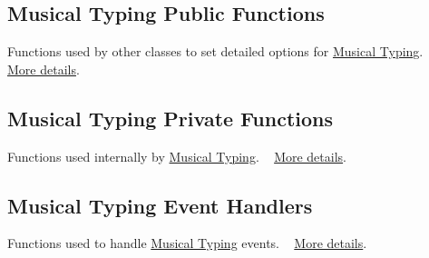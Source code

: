 \begin{DoxyParagraph}{}

\end{DoxyParagraph}
\hypertarget{group___musical_typing_muspubfunc}{}\subsection{Musical Typing Public Functions}\label{group___musical_typing_muspubfunc}
Functions used by other classes to set detailed options for \hyperlink{}{Musical Typing}. ~\newline
 \hyperlink{group___mus_typ_pub_func}{More details}.

\begin{DoxyParagraph}{}

\end{DoxyParagraph}
\hypertarget{group___musical_typing_musprivfunc}{}\subsection{Musical Typing Private Functions}\label{group___musical_typing_musprivfunc}
Functions used internally by \hyperlink{}{Musical Typing}. ~\newline
 \hyperlink{group___mus_typ_priv_func}{More details}.

\begin{DoxyParagraph}{}

\end{DoxyParagraph}
\hypertarget{group___musical_typing_mushandle}{}\subsection{Musical Typing Event Handlers}\label{group___musical_typing_mushandle}
Functions used to handle \hyperlink{}{Musical Typing} events. ~\newline
 \hyperlink{group___mus_typ_handlers}{More details}. 